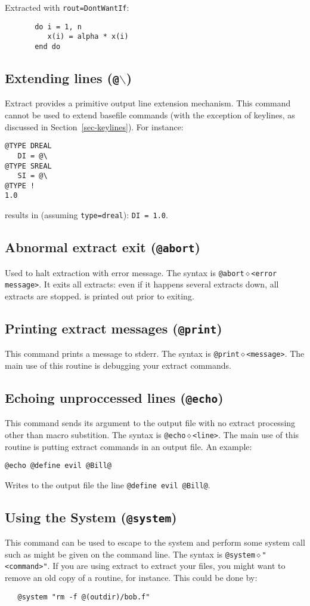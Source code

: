 Extracted with {\tt rout=DontWantIf}:
\begin{verbatim}
       do i = 1, n
          x(i) = alpha * x(i)
       end do
\end{verbatim}

\subsection{Extending lines ({\tt @$\backslash$})}
Extract provides a primitive output line extension mechanism.  This command
cannot be used to extend basefile commands (with the exception of keylines,
as discussed in Section~\ref{sec-keylines}).  For instance:
\begin{verbatim}
@TYPE DREAL
   DI = @\
@TYPE SREAL
   SI = @\
@TYPE !
1.0
\end{verbatim}

results in (assuming {\tt type=dreal}): {\tt DI = 1.0}.

\subsection{Abnormal extract exit ({\tt @abort})}
Used to halt extraction with error message.  The syntax is
{\tt @abort$\diamond$<error message>}.  It exits all extracts:
even if it happens several extracts down, all extracts are stopped.
{\tt <error message>} is printed out prior to exiting.

\subsection{Printing extract messages ({\tt @print})}
This command prints a message to stderr.  The syntax is
{\tt @print$\diamond$<message>}.  The main use of this routine is
debugging your extract commands.

\subsection{Echoing unproccessed lines ({\tt @echo})}
This command sends its argument to the output file with no extract
processing other than macro substition.  The syntax is
{\tt @echo$\diamond$<line>}.  The main use of this routine is
putting extract commands in an output file.  An example:
\begin{verbatim}
@echo @define evil @Bill@
\end{verbatim}
Writes to the output file the line {\tt @define evil @Bill@}.

\subsection{Using the System ({\tt @system})}
This command can be used to escape to the system and perform some system
call such as might be given on the command line.  The syntax is
{\tt @system$\diamond$"<command>"}.  If you are using extract to extract
your files, you might want to remove an old copy of a routine, for instance.
This could be done by:
\begin{verbatim}
   @system "rm -f @(outdir)/bob.f"
\end{verbatim}

